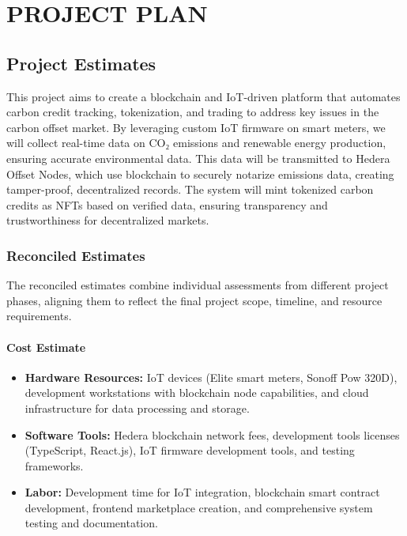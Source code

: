\documentclass[oneside,a4paper,12pt]{book}
\begin{document}
\chapter{PROJECT PLAN}

\newpage

\section{Project Estimates}
This project aims to create a blockchain and IoT-driven platform that automates carbon credit tracking, tokenization, and trading to address key issues in the carbon offset market. By leveraging custom IoT firmware on smart meters, we will collect real-time data on CO₂ emissions and renewable energy production, ensuring accurate environmental data. This data will be transmitted to Hedera Offset Nodes, which use blockchain to securely notarize emissions data, creating tamper-proof, decentralized records. The system will mint tokenized carbon credits as NFTs based on verified data, ensuring transparency and trustworthiness for decentralized markets.

\subsection{Reconciled Estimates}
The reconciled estimates combine individual assessments from different project phases, aligning them to reflect the final project scope, timeline, and resource requirements.

\subsubsection{Cost Estimate}
\begin{itemize}
    \item \textbf{Hardware Resources:} IoT devices (Elite smart meters, Sonoff Pow 320D), development workstations with blockchain node capabilities, and cloud infrastructure for data processing and storage.
    \item \textbf{Software Tools:} Hedera blockchain network fees, development tools licenses (TypeScript, React.js), IoT firmware development tools, and testing frameworks.
    \item \textbf{Labor:} Development time for IoT integration, blockchain smart contract development, frontend marketplace creation, and comprehensive system testing and documentation.
\end{itemize}
\end{document}
